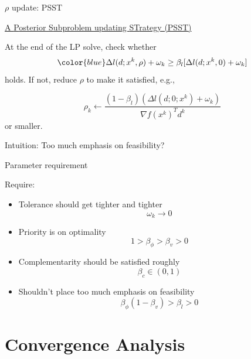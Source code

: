 \documentclass[8pt]{beamer}
\begin{document}
\begin{frame}{$\rho$ update:  PSST} 

\underline{ A {\blue P}osterior {\blue S}ubproblem updating {\blue ST}rategy (PSST) }

\vfill

At the end of the LP solve, check whether 
$${\color{blue}   \Delta l(d; x^k,\rho)  + \omega_k  \ge  \beta_l [\Delta l(d; x^k, 0) + \omega_k}] $$
holds.  If not, reduce $\rho$ to make it satisfied, e.g., 

\[ \rho_k \gets \frac{(1-\beta_l)( \Delta l(d; 0;x^k)+\omega_k) }{ \nabla f(x^k)^Td^k  } \]
 or smaller. 

\vfill

  {\blue 
\leftpointright Intuition:}  Too much emphasis on feasibility?
\end{frame}


\begin{frame}{Parameter requirement}

Require: 
\vfill

\begin{itemize}
\item Tolerance should get tighter and tighter
\[ \boxed{\omega_k \to 0 }\]
\item Priority is on optimality 
\[ \boxed{1> \beta_\phi  > \beta_v > 0}\]
\item Complementarity should be satisfied roughly 
\[\boxed{ \beta_c \in (0,1)}\]
\item Shouldn't place too much emphasis on feasibility 
\[\boxed{ \beta_\phi(1-\beta_v)   > \beta_l>0 }\]
\end{itemize}
 \end{frame}






\section[Convergence Analysis]{Convergence Analysis}
\end{document}
